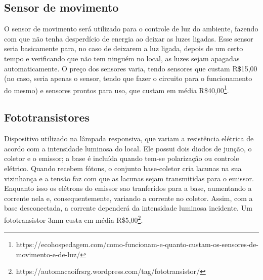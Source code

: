 \subsection{Sensor de movimento}

O sensor de movimento será utilizado para o controle de luz do ambiente, fazendo com que não tenha desperdício de energia ao deixar as luzes ligadas. Esse sensor seria basicamente para, no caso de deixarem a luz ligada, depois de um certo tempo e verificando que não tem ninguém no local, as luzes sejam apagadas automaticamente. O preço dos sensores varia, tendo sensores que custam R\$15,00 (no caso, seria apenas o sensor, tendo que fazer o circuito para o funcionamento do mesmo) e sensores prontos para uso, que custam em média R\$40,00\footnote{https://ecohospedagem.com/como-funcionam-e-quanto-custam-os-sensores-de-movimento-e-de-luz/}.

\subsection{Fototransistores}

Dispositivo utilizado na lâmpada responsiva, que variam a resistência elétrica de acordo com a intensidade luminosa do local. Ele possui dois diodos de junção, o coletor e o emissor; a base é incluída quando tem-se polarização ou controle elétrico. Quando recebem fótons, o conjunto base-coletor cria lacunas na sua vizinhança e a tensão faz com que as lacunas sejam transmitidas para o emissor. Enquanto isso os elétrons do emissor sao tranferidos para a base, aumentando a corrente nela e, consequentemente, variando a corrente no coletor. Assim, com a base desconectada, a corrente dependerá da intensidade luminosa incidente. Um fototransistor 3mm custa em média R\$5,00\footnote{ https://automacaoifrsrg.wordpress.com/tag/fototransistor/}.

